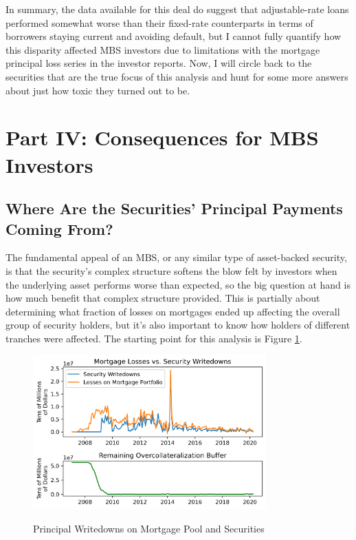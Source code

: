\documentclass[12pt]{article}
\begin{document}
In summary, the data available for this deal do suggest that adjustable-rate loans performed somewhat worse than their fixed-rate counterparts in terms of borrowers staying current and avoiding default, but I cannot fully quantify how this disparity affected MBS investors due to limitations with the mortgage principal loss series in the investor reports. Now, I will circle back to the securities that are the true focus of  this analysis and hunt for some more answers about just how toxic they turned out to be.

\section*{Part IV: Consequences for MBS Investors}

\subsection*{Where Are the Securities' Principal Payments Coming From?}

The fundamental appeal of an MBS, or any similar type of asset-backed security, is that the security’s complex structure softens the blow felt by investors when the underlying asset performs worse than expected, so the big question at hand is how much benefit that complex structure provided. This is partially about determining what fraction of losses on mortgages ended up affecting the overall group of security holders, but it’s also important to know how holders of different tranches were affected. The starting point for this analysis is Figure \ref{fig:timeseries_losses_vs_writedowns}.

\begin{figure}[h]
	\centering
	\caption{Principal Writedowns on Mortgage Pool and Securities}
	\includegraphics[width=0.8\textwidth]{../figures/timeseries_losses_vs_writedowns}
	\label{fig:timeseries_losses_vs_writedowns}
\end{figure}
\end{document}
